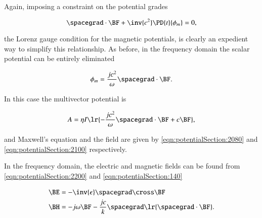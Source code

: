 Again, imposing a constraint on the potential grades

\begin{dmath}\label{eqn:potentialSection:2180}
\spacegrad \cdot \BF
+ \inv{c^2}
\PD{t}{\phi_m}
= 0,
\end{dmath}

the Lorenz gauge condition for the magnetic potentials, is clearly an expedient way to simplify this relationship.
As before, in the frequency domain the scalar potential can be entirely eliminated

\begin{dmath}\label{eqn:potentialSection:2200}
\phi_m = \frac{j c^2}{\omega} \spacegrad \cdot \BF.
\end{dmath}

In this case the
multivector potential is

\begin{dmath}\label{eqn:potentialSection:2220}
A =
\eta I \lr{
-\frac{j c^2}{\omega} \spacegrad \cdot \BF + c \BF
},
\end{dmath}

and Maxwell's equation and the field are given by
\cref{eqn:potentialSection:2080} and
\cref{eqn:potentialSection:2100} respectively.

In the frequency domain, the electric and magnetic fields can be found from
\cref{eqn:potentialSection:2200} and \cref{eqn:potentialSection:140}

\begin{dmath}\label{eqn:potentialSection:2540}
\begin{aligned}
\BE &= -\inv{\epsilon} \spacegrad \cross \BF \\
\BH &=
- j \omega \BF
-\frac{j c}{k} \spacegrad \lr{ \spacegrad \cdot \BF }
.
\end{aligned}
\end{dmath}

%
%

